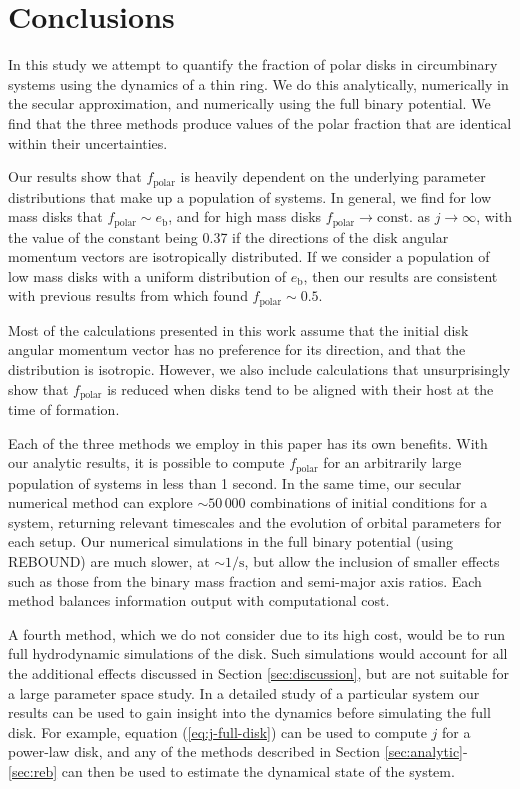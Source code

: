 \documentclass[twocolumn]{aastex631}
\begin{document}
\section{Conclusions}
\label{sec:conclusions}

In this study we attempt to quantify the fraction of polar disks in circumbinary systems using the dynamics of a thin ring. We do this analytically, numerically in the secular approximation, and numerically using the full binary potential. We find that the three methods produce values of the polar fraction that are identical within their uncertainties.

Our results show that $f_\text{polar}$ is heavily dependent on the underlying parameter distributions that make up a population of systems. In general, we find for low mass disks that $f_\text{polar} \sim e_\text{b}$, and for high mass disks $f_\text{polar} \rightarrow \text{const.}$ as $j\rightarrow \infty$, with the value of the constant being 0.37 if the directions of the disk angular momentum vectors are isotropically distributed.
If we consider a population of low mass disks with a uniform distribution of $e_\text{b}$, then our results are consistent with previous results from \citet{ceppi2024} which found $f_\text{polar}\sim 0.5$. 

Most of the calculations presented in this work assume that the initial disk angular momentum vector has no preference for its direction, and that the distribution is isotropic. However, we also include calculations that unsurprisingly show that $f_\text{polar}$ is reduced when disks tend to be aligned with their host at the time of formation.

Each of the three methods we employ in this paper has its own benefits. With our analytic results, it is possible to compute $f_\text{polar}$ for an arbitrarily large population of systems in less than 1 second. In the same time, our secular numerical method can explore $\sim 50\,000$ combinations of initial conditions for a system, returning relevant timescales and the evolution of orbital parameters for each setup. Our numerical simulations in the full binary potential (using {\sc REBOUND}) are much slower, at $\sim 1/\text{s}$, but allow the inclusion of smaller effects such as those from the binary mass fraction and semi-major axis ratios. Each method balances information output with computational cost.

A fourth method, which we do not consider due to its high cost, would be to run full hydrodynamic simulations of the disk. Such simulations would account for all the additional effects discussed in Section \ref{sec:discussion}, but are not suitable for a large parameter space study. In a detailed study of a particular system our results can be used to gain insight into the dynamics before simulating the full disk. For example, equation (\ref{eq:j-full-disk}) can be used to compute $j$ for a power-law disk, and any of the methods described in Section \ref{sec:analytic}-\ref{sec:reb} can then be used to estimate the dynamical state of the system.
\end{document}
